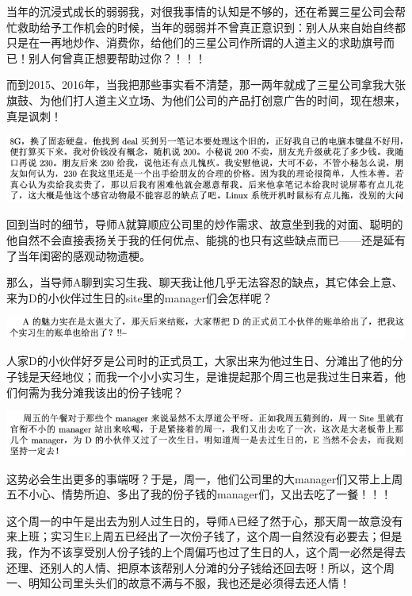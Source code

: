 \documentclass[9pt, b5paper]{article}
\begin{document}
当年的沉浸式成长的弱弱我，对很我事情的认知是不够的，还在希翼三星公司会帮忙救助给予工作机会的时候，当年的弱弱并不曾真正意识到：别人从来自始自终都只是在一再地炒作、消费你，给他们的三星公司作所谓的人道主义的求助旗号而已！别人何曾真正想要帮助过你？！！！

而到2015、2016年，当我把那些事实看不清楚，那一两年就成了三星公司拿我大张旗鼓、为他们打人道主义立场、为他们公司的产品打创意广告的时间，现在想来，真是讽刺！

\begin{center}
\includegraphics[width=.9\linewidth]{./pic/backups_plans_20210513_113459.png}
\end{center}

回到当时的细节，导师A就算顺应公司里的炒作需求、故意坐到我的对面、聪明的他自然不会直接表扬关于我的任何优点、能挑的也只有这些缺点而已——还是延有了当年闺密的感观动物遗梗。

那么，当导师A聊到实习生我、聊天我让他几乎无法容忍的缺点，其它体会上意、来为D的小伙伴过生日的site里的manager们会怎样呢？

\begin{center}
\includegraphics[width=.9\linewidth]{./pic/backups_plans_20210513_113638.png}
\end{center}

人家D的小伙伴好歹是公司时的正式员工，大家出来为他过生日、分滩出了他的分子钱是天经地仪；而我一个小小实习生，是谁提起那个周三也是我过生日来着，他们何需为我分滩我该出的份子钱呢？

\begin{center}
\includegraphics[width=.9\linewidth]{./pic/backups_plans_20210513_113937.png}
\end{center}

这势必会生出更多的事端呀？于是，周一，他们公司里的大manager们又带上上周五不小心、情势所迫、多出了我的份子钱的manager们，又出去吃了一餐！！！

这个周一的中午是出去为别人过生日的，导师A已经了然于心，那天周一故意没有来上班；实习生E上周五已经出了一次份子钱了，这个周一自然没有必要去；但是我，作为不该享受别人份子钱的上个周偏巧也过了生日的人，这个周一必然是得去还理、还别人的人情、把原本该帮别人分滩的分子钱给还回去呀！所以，这个周一、明知公司里头头们的故意不满与不服，我也还是必须得去还人情！
\end{document}
